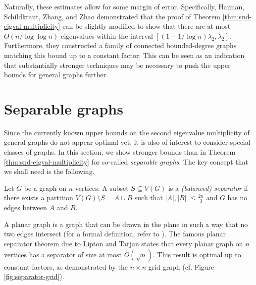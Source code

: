 Naturally, these estimates allow for some margin of error. 
Specifically, Haiman, Schildkraut, Zhang, and Zhao \cite{snd-eigval-lower-construction} demonstrated that the proof of Theorem \ref{thm:snd-eigval-multiplicity} can be slightly modified to show that there are at most $O(n / \log \log n)$ eigenvalues within the interval $[(1 - 1/\log n) \lambda_2, \lambda_2]$.
Furthermore, they constructed a family of connected bounded-degree graphs matching this bound up to a constant factor. 
This can be seen as an indication that substantially stronger techniques may be necessary to push the upper bounds for general graphs further.

\section{Separable graphs}
Since the currently known upper bounds on the second eigenvalue multiplicity of general graphs do not appear optimal yet, it is also of interest to consider special classes of graphs. 
In this section, we show stronger bounds than in Theorem \ref{thm:snd-eigval-multiplicity} for so-called \textit{separable graphs}.
The key concept that we shall need is the following.

\begin{definition}
    Let $G$ be a graph on $n$ vertices. 
    A subset $S \subseteq V(G)$ is a \textit{(balanced) separator} if there exists a partition $V(G) \setminus  S =  A \cup B$ such that $|A|, |B|\;\le \frac{2n}{3}$ and $G$ has no edges between $A$ and $B$.
\end{definition}

A planar graph is a graph that can be drawn in the plane in such a way that no two edges intersect (for a formal definition, refer to \cite[Chapter 4]{diestel}). 
The famous planar separator theorem due to Lipton and Tarjan \cite{liptontarjan} states that every planar graph on $n$ vertices has a separator of size at most $O(\sqrt{n})$. 
This result is optimal up to constant factors, as demonstrated by the $n \times n$ grid graph (cf. Figure \ref{fig:separator-grid}).

